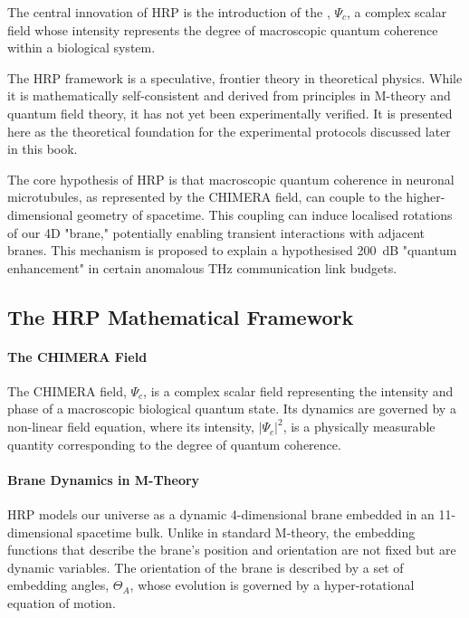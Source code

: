 The central innovation of HRP is the introduction of the , \(\Psi_c\), a complex scalar field whose intensity represents the degree of macroscopic quantum coherence within a biological system.

\begin{warningbox}
    The HRP framework is a speculative, frontier theory in theoretical physics. While it is mathematically self-consistent and derived from principles in M-theory and quantum field theory, it has not yet been experimentally verified. It is presented here as the theoretical foundation for the experimental protocols discussed later in this book.
\end{warningbox}

\begin{keyconcept}
    The core hypothesis of HRP is that macroscopic quantum coherence in neuronal microtubules, as represented by the CHIMERA field, can couple to the higher-dimensional geometry of spacetime. This coupling can induce localised rotations of our 4D "brane," potentially enabling transient interactions with adjacent branes. This mechanism is proposed to explain a hypothesised 200~dB "quantum enhancement" in certain anomalous THz communication link budgets.
\end{keyconcept}

\subsection{The HRP Mathematical Framework}

\paragraph{The CHIMERA Field}
The CHIMERA field, \(\Psi_c\), is a complex scalar field representing the intensity and phase of a macroscopic biological quantum state. Its dynamics are governed by a non-linear field equation, where its intensity, \(|\Psi_c|^2\), is a physically measurable quantity corresponding to the degree of quantum coherence.

\paragraph{Brane Dynamics in M-Theory}
HRP models our universe as a dynamic 4-dimensional brane embedded in an 11-dimensional spacetime bulk. Unlike in standard M-theory, the embedding functions that describe the brane's position and orientation are not fixed but are dynamic variables. The orientation of the brane is described by a set of embedding angles, \(\Theta_A\), whose evolution is governed by a hyper-rotational equation of motion.

